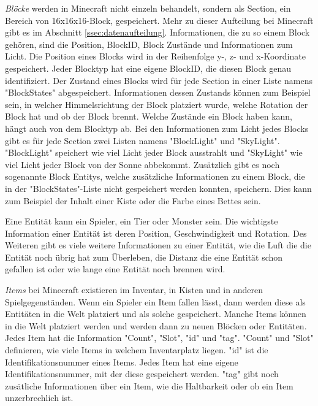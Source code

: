 \textit{Blöcke} werden in Minecraft nicht einzeln behandelt, sondern als Section, ein Bereich von 16x16x16-Block, gespeichert. Mehr zu dieser Aufteilung bei Minecraft gibt es im Abschnitt \ref{ssec:datenaufteilung}. Informationen, die zu so einem Block gehören, sind die Position, BlockID, Block Zustände und Informationen zum Licht. Die Position eines Blocks wird in der Reihenfolge y-, z- und x-Koordinate gespeichert. Jeder Blocktyp hat eine eigene BlockID, die diesen Block genau identifiziert. Der Zustand eines Blocks wird für jede Section in einer Liste namens "BlockStates" abgespeichert. Informationen dessen Zustands können zum Beispiel sein, in welcher Himmelsrichtung der Block platziert wurde, welche Rotation der Block hat und ob der Block brennt. Welche Zustände ein Block haben kann, hängt auch von dem Blocktyp ab.\cite{minecraftBlockStates} Bei den Informationen zum Licht jedes Blocks gibt es für jede Section zwei Listen namens "BlockLight" und "SkyLight". "BlockLight" speichert wie viel Licht jeder Block ausstrahlt und "SkyLight" wie viel Licht jeder Block von der Sonne abbekommt. Zusätzlich gibt es noch sogenannte Block Entitys, welche zusätzliche Informationen zu einem Block, die in der "BlockStates"-Liste nicht gespeichert werden konnten, speichern.\cite{minecraftChunkFormat} Dies kann zum Beispiel der Inhalt einer Kiste oder die Farbe eines Bettes sein.\cite{minecraftBlockEntity}

Eine Entität kann ein Spieler, ein Tier oder Monster sein. Die wichtigste Information einer Entität ist deren Position, Geschwindigkeit und Rotation. Des Weiteren gibt es viele weitere Informationen zu einer Entität, wie die Luft die die Entität noch übrig hat zum Überleben, die Distanz die eine Entität schon gefallen ist oder wie lange eine Entität noch brennen wird.\cite{minecraftEntityFormat}

\textit{Items} bei Minecraft existieren im Inventar, in Kisten und in anderen Spielgegenständen. Wenn ein Spieler ein Item fallen lässt, dann werden diese als Entitäten in die Welt platziert und als solche gespeichert. Manche Items können in die Welt platziert werden und werden dann zu neuen Blöcken oder Entitäten. Jedes Item hat die Information "Count", "Slot", "id" und "tag". "Count" und "Slot" definieren, wie viele Items in welchem Inventarplatz liegen. "id" ist die Identifikationsnummer eines Items. Jedes Item hat eine eigene Identifikationsnummer, mit der diese gespeichert werden. "tag" gibt noch zusätliche Informationen über ein Item, wie die Haltbarkeit oder ob ein Item unzerbrechlich ist.
\cite{minecraftPlayerdatFormat}
\cite{minecraftItem}

